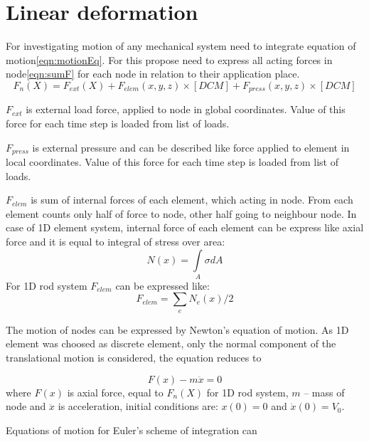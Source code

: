 
\section*{Linear deformation}
For investigating motion of any mechanical system need to integrate equation of
motion\eqref{eqn:motionEq}. For this propose need to express all acting forces in
node\eqref{eqn:sumF} for each node in relation to their application place. 
\begin{equation}\label{eqn:sumF}
   F_n(X)=
   F_{ext}(X)+
   F_{elem}(x, y, z)\times[DCM]+
   F_{press}(x, y, z)\times[DCM]
\end{equation}\par
$F_{ext}$ is external load force, applied to node in global coordinates. Value
of this force for each time step is loaded from list of loads.\par $F_{press}$
is external pressure and can be described like force applied to element in local
coordinates. Value of this force for each time step is loaded from list of
loads.\par $F_{elem}$ is sum of internal forces of each element, which acting in
node. From each element counts only half of force to node, other half going to
neighbour node. In case of 1D element system, internal force of each element can
be express like axial force and it is equal to integral of stress over area:
\begin{equation}\label{eqn:Nx}
  N(x)= \int\limits_A \sigma dA
\end{equation}
For 1D rod system $F_{elem}$ can be expressed like:
\begin{equation}\label{eqn:Felem}
  F_{elem}= \sum_{e}N_e(x)/2
\end{equation}\par
The motion of nodes can be expressed by Newton's equation of motion. As 1D
element was choosed as discrete element, only the normal component of the
translational motion is considered, the equation reduces to\par
\begin{equation}\label{eqn:motionEq}
   F(x)-m\ddot{x}=0
\end{equation}
where $F(x)$ is axial force, equal to $F_n(X)$ for 1D rod system, $m$ – mass of
node and $\ddot{x}$ is acceleration, initial conditions are: $x(0)=0$ and
$\dot{x}(0)=V_0$.\par Equations of motion for Euler's scheme of integration can
